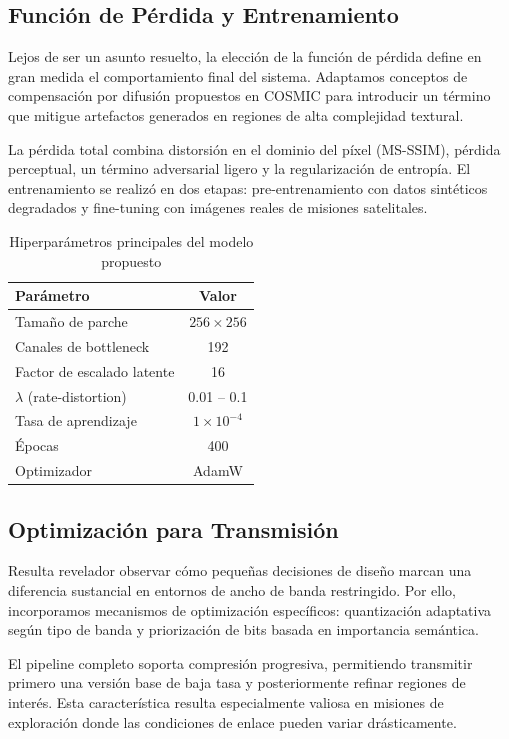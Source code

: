 \subsection{Función de Pérdida y Entrenamiento}

Lejos de ser un asunto resuelto, la elección de la función de pérdida define en gran medida el comportamiento final del sistema. Adaptamos conceptos de compensación por difusión propuestos en COSMIC \cite{COSMIC2024} para introducir un término que mitigue artefactos generados en regiones de alta complejidad textural.

La pérdida total combina distorsión en el dominio del píxel (MS-SSIM), pérdida perceptual, un término adversarial ligero y la regularización de entropía. El entrenamiento se realizó en dos etapas: pre-entrenamiento con datos sintéticos degradados y fine-tuning con imágenes reales de misiones satelitales.

\begin{table}[h]
\centering
\caption{Hiperparámetros principales del modelo propuesto}
\label{tab:hiperparametros}
\begin{tabular}{lc}
\hline
\textbf{Parámetro} & \textbf{Valor} \\
\hline
Tamaño de parche & $256 \times 256$ \\
Canales de bottleneck & 192 \\
Factor de escalado latente & 16 \\
$\lambda$ (rate-distortion) & 0.01 -- 0.1 \\
Tasa de aprendizaje & $1 \times 10^{-4}$ \\
Épocas & 400 \\
Optimizador & AdamW \\
\hline
\end{tabular}
\end{table}

\subsection{Optimización para Transmisión}

Resulta revelador observar cómo pequeñas decisiones de diseño marcan una diferencia sustancial en entornos de ancho de banda restringido. Por ello, incorporamos mecanismos de optimización específicos: quantización adaptativa según tipo de banda y priorización de bits basada en importancia semántica.

El pipeline completo soporta compresión progresiva, permitiendo transmitir primero una versión base de baja tasa y posteriormente refinar regiones de interés. Esta característica resulta especialmente valiosa en misiones de exploración donde las condiciones de enlace pueden variar drásticamente.

